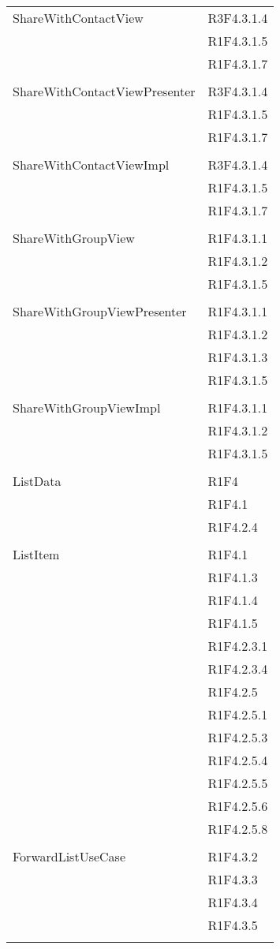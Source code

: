 \begin{center}
\begin{longtable}{|p{7cm}|p{7cm}|}
		ShareWithContactView & R3F4.3.1.4 \\ & R1F4.3.1.5 \\ & R1F4.3.1.7 \\ & \\ \hline
		ShareWithContactViewPresenter & R3F4.3.1.4 \\ & R1F4.3.1.5 \\ & R1F4.3.1.7 \\ & \\ \hline
		ShareWithContactViewImpl & R3F4.3.1.4 \\ & R1F4.3.1.5 \\ & R1F4.3.1.7 \\ & \\ \hline
		ShareWithGroupView & R1F4.3.1.1 \\ & R1F4.3.1.2 \\ & R1F4.3.1.5 \\ & \\ \hline
		ShareWithGroupViewPresenter & R1F4.3.1.1 \\ & R1F4.3.1.2 \\ & R1F4.3.1.3 \\ & R1F4.3.1.5 \\ & \\ \hline
		ShareWithGroupViewImpl & R1F4.3.1.1 \\ & R1F4.3.1.2 \\ & R1F4.3.1.5 \\ & \\ \hline
		ListData & R1F4 \\ & R1F4.1 \\ & R1F4.2.4 \\ & \\ \hline
		ListItem & R1F4.1 \\ & R1F4.1.3 \\ & R1F4.1.4 \\ & R1F4.1.5 \\ & R1F4.2.3.1 \\ & R1F4.2.3.4 \\ & R1F4.2.5 \\ & R1F4.2.5.1 \\ & R1F4.2.5.3 \\ & R1F4.2.5.4 \\ & R1F4.2.5.5 \\ & R1F4.2.5.6 \\ & R1F4.2.5.8 \\ & \\ \hline
		ForwardListUseCase & R1F4.3.2 \\ & R1F4.3.3 \\ & R1F4.3.4 \\ & R1F4.3.5 \\ & \\ \hline

\end{longtable}
\end{center}
